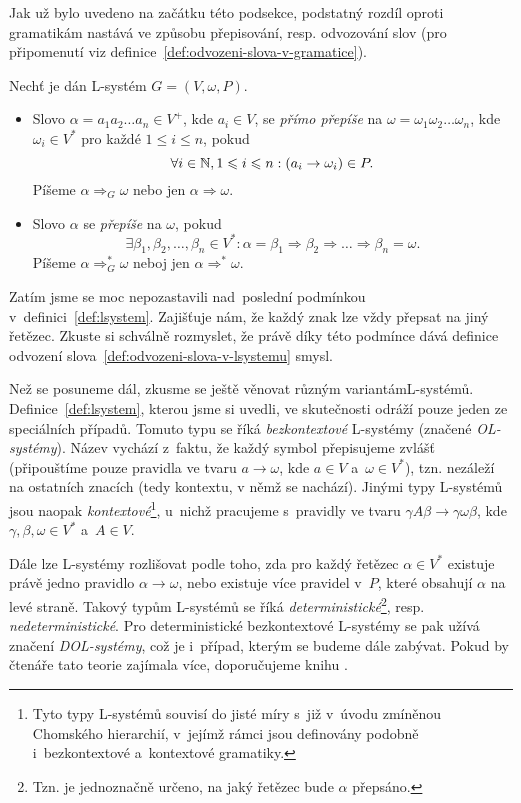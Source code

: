 Jak už bylo uvedeno na začátku této podsekce, podstatný rozdíl oproti gramatikám nastává ve způsobu přepisování, resp. odvozování slov (pro připomenutí viz definice~\ref{def:odvozeni-slova-v-gramatice}).
\begin{definition}\label{def:odvozeni-slova-v-lsystemu}
    Nechť je dán L-systém $G=(V,\omega,P)$.
    \begin{itemize}
        \item Slovo $\alpha=a_1a_2\ldots a_n\in V^+$, kde $a_i\in V$, se \emph{přímo přepíše} na $\omega=\omega_1\omega_2\ldots\omega_n$, kde $\omega_i\in V^*$ pro každé $1\leqslant i\leqslant n$, pokud
        \[\forall i\in\mathbb{N},1\leqslant i\leqslant n: (a_i\to\omega_i)\in P.\]
        Píšeme $\alpha\Rightarrow_G\omega$ nebo jen $\alpha\Rightarrow\omega$.
        \item Slovo $\alpha$ se \emph{přepíše} na $\omega$, pokud
        \[\exists\beta_1,\beta_2,\ldots,\beta_n\in V^*:\alpha=\beta_1\Rightarrow\beta_2\Rightarrow\dots\Rightarrow\beta_n=\omega.\]
        Píšeme $\alpha\Rightarrow_G^*\omega$ neboj jen $\alpha\Rightarrow^*\omega$.
    \end{itemize}
\end{definition}
Zatím jsme se moc nepozastavili nad~poslední podmínkou v~definici~\ref{def:lsystem}. Zajišťuje nám, že každý znak lze vždy přepsat na jiný řetězec. Zkuste si schválně rozmyslet, že právě díky této podmínce dává definice odvození slova~\ref{def:odvozeni-slova-v-lsystemu} smysl.

Než se posuneme dál, zkusme se ještě věnovat různým variantám\linebreak L-systémů. Definice~\ref{def:lsystem}, kterou jsme si uvedli, ve skutečnosti odráží pouze jeden ze speciálních případů. Tomuto typu se říká \emph{bezkontextové} L-systémy (značené \emph{OL-systémy}). Název vychází z~faktu, že každý symbol přepisujeme zvlášť (připouštíme pouze pravidla ve tvaru $a\to\omega$, kde $a\in V$ a~$\omega\in V^*$), tzn. nezáleží na ostatních znacích (tedy kontextu, v němž se nachází). Jinými typy L-systémů jsou naopak \emph{kontextové}\footnote{Tyto typy L-systémů souvisí do jisté míry s~již v~úvodu zmíněnou Chomského hierarchií, v~jejímž rámci jsou definovány podobně i~bezkontextové a~kontextové gramatiky.}, u~nichž pracujeme s~pravidly ve tvaru $\gamma A\beta\to\gamma\omega\beta$, kde $\gamma,\beta,\omega\in V^*$ a~$A\in V$.

Dále lze L-systémy rozlišovat podle toho, zda pro každý řetězec $\alpha\in V^*$ existuje právě jedno pravidlo $\alpha\to\omega$, nebo existuje více pravidel v~$P$, které obsahují $\alpha$ na levé straně. Takový typům L-systémů se říká \emph{deterministické}\footnote{Tzn. je jednoznačně určeno, na jaký řetězec bude $\alpha$ přepsáno.}, resp. \emph{nedeterministické}. Pro deterministické bezkontextové L-systémy se pak užívá značení \emph{DOL-systémy}, což je i~případ, kterým se budeme dále zabývat. Pokud by čtenáře tato teorie zajímala více, doporučujeme knihu \cite{Prusinkiewicz1990}.


